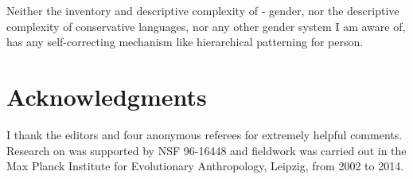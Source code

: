 \documentclass[output=collectionpaper]{langsci/langscibook}
\begin{document}
Neither the inventory and descriptive complexity of - gender, nor the descriptive complexity of conservative  languages, nor any other gender system I am aware of, has any self-correcting mechanism like hierarchical patterning for person.


\section*{Acknowledgments}
I thank the editors and four anonymous referees for extremely helpful comments. Research on  was supported by NSF 96-16448 and  fieldwork was carried out in the Max Planck Institute for Evolutionary Anthropology, Leipzig, from 2002 to 2014.

\printbibliography[heading=subbibliography,notkeyword=this]

\label{lastpage:Nichols}
\end{document}
